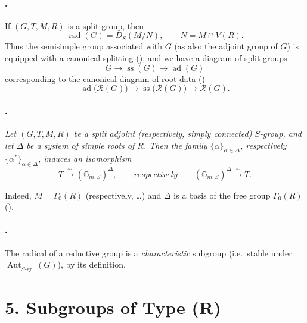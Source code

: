 \paragraph{.}
If \((G,T,M,R)\) is a split group, then
\[
  \operatorname{rad}(G)=D_S(M/N),
  \qquad
  N=M\cap V(R).
\]
Thus the semisimple group associated with \(G\)
\textup{(as also the adjoint group of \(G\))} is equipped with a
canonical splitting \textup{()}, and we have a diagram of
split groups
\[
  G\longrightarrow \operatorname{ss}(G)
   \longrightarrow \operatorname{ad}(G)
\]
corresponding to the canonical diagram of root data
\textup{()}
\[
  \operatorname{ad}\bigl(\mathscr R(G)\bigr)
  \longrightarrow
  \operatorname{ss}\bigl(\mathscr R(G)\bigr)
  \longrightarrow
  \mathscr R(G).
\]

\paragraph{.}
\textit{Let \((G,T,M,R)\) be a split adjoint
\textup{(respectively, simply connected)} \(S\)-group, and let
\(\Delta\) be a system of simple roots of \(R\). Then the family
\(\{\alpha\}_{\alpha\in\Delta}\), respectively
\(\{\alpha^*\}_{\alpha\in\Delta}\), induces an isomorphism}
\[
  T\xrightarrow{\ \sim\ }(\mathbb G_{m,S})^\Delta,
  \qquad\textit{respectively}\qquad
  (\mathbb G_{m,S})^\Delta\xrightarrow{\ \sim\ }T.
\]

Indeed, \(M=\Gamma_0(R)\) \textup{(respectively, \ldots)} and \(\Delta\) is a
basis of the free group \(\Gamma_0(R)\)
\textup{()}.

\paragraph{.}
The radical of a reductive group is a \emph{characteristic}
subgroup \textup{(i.e.\ stable under
\(\underline{\operatorname{Aut}}_{S\text{-gr.}}(G)\))}, by its
definition.

\section*{5. Subgroups of Type
\textup{(R)}}

